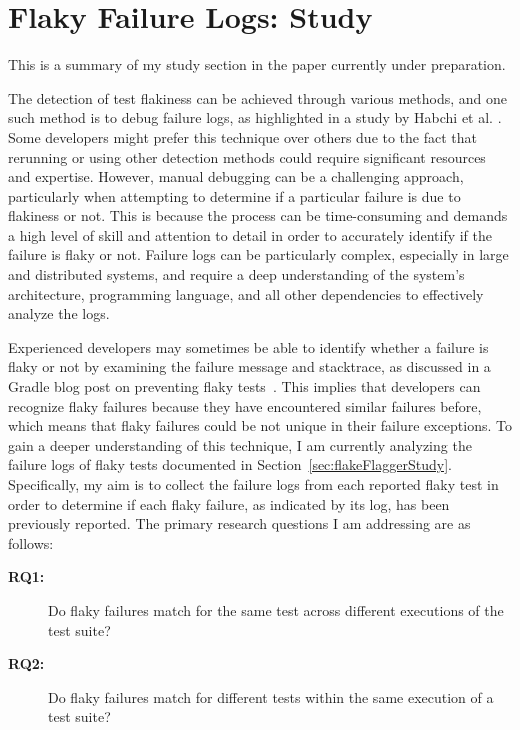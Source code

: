 
\section{Flaky Failure Logs: Study}
\label{sec:failureLogsStudy}

This is a summary of my study section in the paper currently under preparation.


The detection of test flakiness can be achieved through various methods, and one such method is to debug failure logs, as highlighted in a study by Habchi et al. \cite{habchi2022qualitative}. Some developers might prefer this technique over others due to the fact that rerunning or using other detection methods could require significant resources and expertise. However, manual debugging can be a challenging approach, particularly when attempting to determine if a particular failure is due to flakiness or not. This is because the process can be time-consuming and demands a high level of skill and attention to detail in order to accurately identify if the failure is flaky or not. Failure logs can be particularly complex, especially in large and distributed systems, and require a deep understanding of the system's architecture, programming language, and all other dependencies to effectively analyze the logs.


Experienced developers may sometimes be able to identify whether a failure is flaky or not by examining the failure message and stacktrace, as discussed in a Gradle blog post on preventing flaky tests~\cite{gradlePreventingFlaky}.
This implies that developers can recognize flaky failures because they have encountered similar failures before, which means that flaky failures could be not unique in their failure exceptions. To gain a deeper understanding of this technique, I am currently analyzing the failure logs of flaky tests documented in Section~\ref{sec:flakeFlaggerStudy}. Specifically, my aim is to collect the failure logs from each reported flaky test in order to determine if each flaky failure, as indicated by its log, has been previously reported. The primary research questions I am addressing are as follows:


\begin{description}
  \item[\textbf{RQ1:}] Do flaky failures match for the same test across different executions of the test suite?
  \item[\textbf{RQ2:}] Do flaky failures match for different tests within the same execution of a test suite?

 \end{description}

